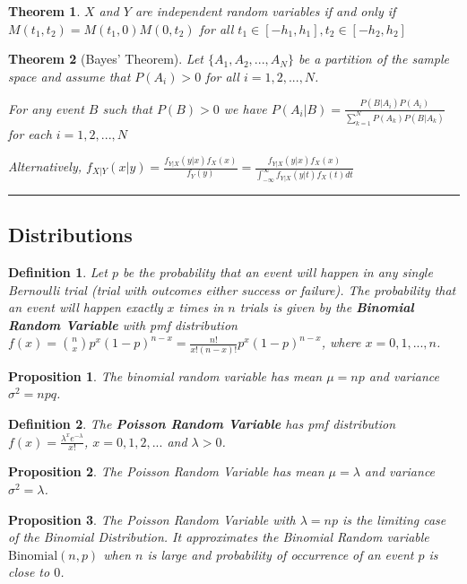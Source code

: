 \documentclass[14pt,twoside]{extreport}
\newcommand{\hhrule}{\vspace{1cm}\hrule\vspace{1cm}}
\theoremstyle{dotless}
\newtheorem*{defn}{\footnotesize Definition}
\newtheorem*{thm}{\footnotesize Theorem} %
\newtheorem*{prop}{\footnotesize Proposition} %
\begin{document}
\begin{thm}
    $X$ and $Y$ are independent random variables if and only if $M(t_1, t_2) = M(t_1, 0) M(0, t_2)$ for all $t_1 \in [-h_1, h_1], t_2 \in [-h_2, h_2]$
\end{thm}

\begin{thm}[Bayes' Theorem]
    Let $\{ A_1, A_2, ..., A_N \}$ be a partition of the sample space and assume that $P(A_i) > 0$ for all $i = 1,2, ..., N$.

    For any event $B$ such that $P(B) > 0$ we have $P(A_i | B) = \frac{P(B|A_i)P(A_i)}{\sum_{k=1}^N P(A_k) P(B|A_k)}$ for each $i = 1, 2, ..., N$


    Alternatively, $f_{X|Y}(x|y) = \frac{f_{Y|X}(y|x) f_X(x)}{f_Y(y)} = \frac{f_{Y|X} (y|x) f_X(x)}{\int_{-\infty}^{\infty} f_{Y|X} (y|t) f_X(t) dt }$
\end{thm}


\hhrule
\subsection*{Distributions}

\begin{defn}
    Let $p$ be the probability that an event will happen in any single Bernoulli trial (trial with outcomes either success or failure). The probability that an event will happen exactly $x$ times in $n$ trials is given by the \textbf{Binomial Random Variable} with pmf distribution $f(x) = {n \choose x} p^x (1-p)^{n-x} = \displaystyle \frac{n!}{x! (n-x)!} p^x (1-p)^{n-x}$, where $x = 0, 1, ... , n$.
\end{defn}

\begin{prop}
The binomial random variable has mean $\mu = np$ and variance $\sigma^2 = npq$.
\end{prop}

\begin{defn}
    The \textbf{Poisson Random Variable} has pmf distribution $f(x) = \displaystyle \frac{\lambda^x e^{-\lambda}}{x!}$, $x = 0, 1, 2, ...$ and $\lambda > 0$.
\end{defn}

\begin{prop}
The Poisson Random Variable has mean $\mu = \lambda$ and variance $\sigma^2 = \lambda$.
\end{prop}
\begin{prop}
    The Poisson Random Variable with $\lambda = np$ is the limiting case of the Binomial Distribution. It approximates the Binomial Random variable $\text{Binomial}(n,p)$ when $n$ is large and probability of occurrence of an event $p$ is close to $0$.
\end{prop}
\end{document}
